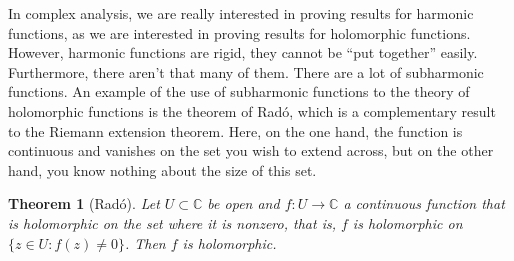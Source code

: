 \documentclass[12pt,openany]{book}
\newcommand{\C}{{\mathbb{C}}}
\newcommand{\myquote}[1]{``#1''}
\theoremstyle{plain}
\newtheorem{thm}{Theorem}[section]
\theoremstyle{remark}
\theoremstyle{definition}
\theoremstyle{exercise}
\theoremstyle{example}
\begin{document}
In complex analysis,
we are really interested in proving results for harmonic functions,
as we are interested in proving results for holomorphic functions.
However, harmonic functions are rigid, they cannot be
\myquote{put together} easily.
Furthermore, there aren't that many of them.  There are a lot of
subharmonic functions.
An example of the use of subharmonic functions to
the theory of holomorphic functions is the theorem of 
Rad\'o, which is a complementary result to the Riemann extension theorem.
Here, on the one hand, the function is
continuous and vanishes on the set you wish to extend across, but on the
other hand, you know nothing about the size of this set.

\begin{thm}[Rad\'o]\label{thm:rado}
Let $U \subset \C$ be open and $f \colon U \to \C$ a continuous
function that is holomorphic on the set where it is nonzero, that is,
$f$ is holomorphic on $\bigl\{ z \in U : f(z) \not= 0 \bigr\}$.
Then $f$ is holomorphic.
\end{thm}
\end{document}
